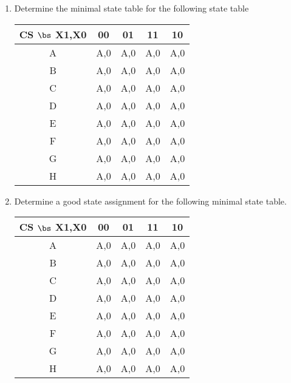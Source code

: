 \begin{enumerate}
\item Determine the minimal state table for the following state table

\begin{tabular}{c||c|c|c|c}
CS $\bs$ X1,X0& 00	& 01	& 11	& 10	\\ \hline
A	& A,0	& A,0	& A,0	& A,0	\\ \hline
B	& A,0	& A,0	& A,0	& A,0	\\ \hline
C	& A,0	& A,0	& A,0	& A,0	\\ \hline
D	& A,0	& A,0	& A,0	& A,0	\\ \hline
E	& A,0	& A,0	& A,0	& A,0	\\ \hline
F	& A,0	& A,0	& A,0	& A,0	\\ \hline
G	& A,0	& A,0	& A,0	& A,0	\\ \hline
H	& A,0	& A,0	& A,0	& A,0	\\ 
\end{tabular}

\item Determine a good state assignment for the following minimal state
table.

\begin{tabular}{c||c|c|c|c}
CS $\bs$ X1,X0& 00	& 01	& 11	& 10	\\ \hline
A	& A,0	& A,0	& A,0	& A,0	\\ \hline
B	& A,0	& A,0	& A,0	& A,0	\\ \hline
C	& A,0	& A,0	& A,0	& A,0	\\ \hline
D	& A,0	& A,0	& A,0	& A,0	\\ \hline
E	& A,0	& A,0	& A,0	& A,0	\\ \hline
F	& A,0	& A,0	& A,0	& A,0	\\ \hline
G	& A,0	& A,0	& A,0	& A,0	\\ \hline
H	& A,0	& A,0	& A,0	& A,0	\\ 
\end{tabular}

\end{enumerate}

